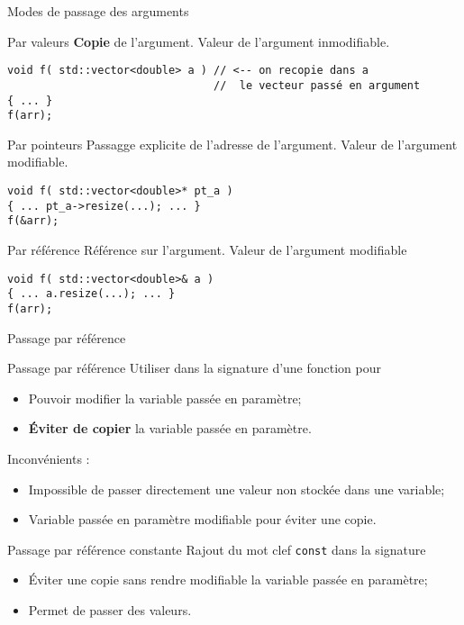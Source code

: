 \documentclass[handout,10pt]{beamer}
\begin{document}
\begin{frame}[fragile]{Modes de passage des arguments}
\tiny
\begin{block}{Par valeurs}
\textbf{Copie} de l'argument. Valeur de
l'argument inmodifiable.
\begin{lstlisting}
void f( std::vector<double> a ) // <-- on recopie dans a
                                //  le vecteur passé en argument
{ ... }
f(arr);
\end{lstlisting}
\end{block}

\begin{block}{Par pointeurs}
Passagge explicite de l'adresse de l'argument. Valeur de l'argument modifiable.
\begin{lstlisting}
void f( std::vector<double>* pt_a )
{ ... pt_a->resize(...); ... }
f(&arr);
\end{lstlisting}
\end{block}

\begin{block}{Par référence}
Référence sur l'argument. Valeur de l'argument modifiable
\begin{lstlisting}
void f( std::vector<double>& a )
{ ... a.resize(...); ... }
f(arr);
\end{lstlisting}
\end{block}
\end{frame}

\begin{frame}[fragile]{Passage par référence}
\tiny
\begin{block}{Passage par référence}
Utiliser dans la signature d'une fonction pour
\begin{itemize}
\item Pouvoir modifier la variable passée en paramètre;
\item \textbf{Éviter de copier} la variable passée en paramètre.
\end{itemize}
Inconvénients :
\begin{itemize}
\item Impossible de passer directement une valeur non stockée dans une variable;
\item Variable passée en paramètre modifiable pour éviter une copie.
\end{itemize}
\end{block}

\begin{block}{Passage par référence constante}
Rajout du mot clef \lstinline{const} dans la signature
\begin{itemize}
\item Éviter une copie sans rendre modifiable la variable passée en paramètre;
\item Permet de passer des valeurs.
\end{itemize}
\end{block}
\end{frame}
\end{document}
